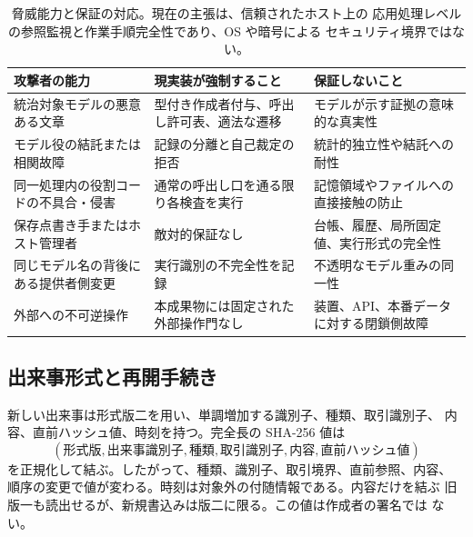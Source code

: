 \begin{table}[htbp]
  \centering
  \small
  \begin{tabularx}{\textwidth}{@{}p{}XX@{}}
    \toprule
    \textbf{攻撃者の能力} & \textbf{現実装が強制すること} &
    \textbf{保証しないこと} \\
    \midrule
    統治対象モデルの悪意ある文章 &
      型付き作成者付与、呼出し許可表、適法な遷移 &
      モデルが示す証拠の意味的な真実性 \\
    モデル役の結託または相関故障 &
      記録の分離と自己裁定の拒否 &
      統計的独立性や結託への耐性 \\
    同一処理内の役割コードの不具合・侵害 &
      通常の呼出し口を通る限り各検査を実行 &
      記憶領域やファイルへの直接接触の防止 \\
    保存点書き手またはホスト管理者 &
      敵対的保証なし &
      台帳、履歴、局所固定値、実行形式の完全性 \\
    同じモデル名の背後にある提供者側変更 &
      実行識別の不完全性を記録 &
      不透明なモデル重みの同一性 \\
    外部への不可逆操作 &
      本成果物には固定された外部操作門なし &
      装置、API、本番データに対する閉鎖側故障 \\
    \bottomrule
  \end{tabularx}
  \caption{脅威能力と保証の対応。現在の主張は、信頼されたホスト上の
  応用処理レベルの参照監視と作業手順完全性であり、OS や暗号による
  セキュリティ境界ではない。}
  \label{tab:threat-capability}
\end{table}

\subsection{出来事形式と再開手続き}\label{sec:appendix:events}

新しい出来事は形式版二を用い、単調増加する識別子、種類、取引識別子、
内容、直前ハッシュ値、時刻を持つ。完全長の SHA-256 値は
\[
  (\textit{形式版},\textit{出来事識別子},\textit{種類},
  \textit{取引識別子},\textit{内容},\textit{直前ハッシュ値})
\]
を正規化して結ぶ。したがって、種類、識別子、取引境界、直前参照、内容、
順序の変更で値が変わる。時刻は対象外の付随情報である。内容だけを結ぶ
旧版一も読出せるが、新規書込みは版二に限る。この値は作成者の署名では
ない。

